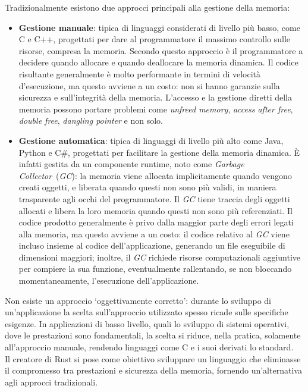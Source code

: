 Tradizionalmente esistono due approcci principali alla gestione della memoria:
\begin{itemize}
    \item \textbf{Gestione manuale}: tipica di linguaggi considerati di livello più basso, come C e C++, progettati per dare al programmatore il massimo controllo sulle risorse, compresa la memoria. Secondo questo approccio è il programmatore a decidere quando allocare e quando deallocare la memoria dinamica. Il codice risultante generalmente è molto performante in termini di velocità d'esecuzione, ma questo avviene a un costo: non si hanno garanzie sulla sicurezza e sull'integrità della memoria. L'accesso e la gestione diretti della memoria possono portare problemi come \textit{unfreed memory}, \textit{access after free}, \textit{double free}, \textit{dangling pointer} e non solo.
    \item \textbf{Gestione automatica}: tipica di linguaggi di livello più alto come Java, Python e C\#, progettati per facilitare la gestione della memoria dinamica. È infatti gestita da un componente runtime, noto come \textit{Garbage Collector}~(\textit{GC}): la memoria viene allocata implicitamente quando vengono creati oggetti, e liberata quando questi non sono più validi, in maniera trasparente agli occhi del programmatore. Il \textit{GC} tiene traccia degli oggetti allocati e libera la loro memoria quando questi non sono più referenziati. Il codice prodotto generalmente è privo dalla maggior parte degli errori legati alla memoria, ma questo avviene a un costo: il codice relativo al \textit{GC} viene incluso insieme al codice dell'applicazione, generando un file eseguibile di dimensioni maggiori; inoltre, il \textit{GC} richiede risorse computazionali aggiuntive per compiere la sua funzione, eventualmente rallentando, se non bloccando momentaneamente, l'esecuzione dell'applicazione.
\end{itemize}
Non esiste un approccio `oggettivamente corretto': durante lo sviluppo di un'applicazione 
la scelta sull'approccio utilizzato spesso ricade sulle specifiche esigenze.
In applicazioni di basso livello, quali lo sviluppo di sistemi operativi, dove le prestazioni sono fondamentali, la scelta si riduce, 
nella pratica, solamente all'approccio manuale, rendendo linguaggi come C e i suoi derivati lo standard.\hfill
\vspace{15pt}\\
Il creatore di Rust si pose come obiettivo sviluppare un linguaggio che eliminasse il compromesso tra prestazioni e sicurezza della memoria, fornendo un'alternativa agli approcci tradizionali.

